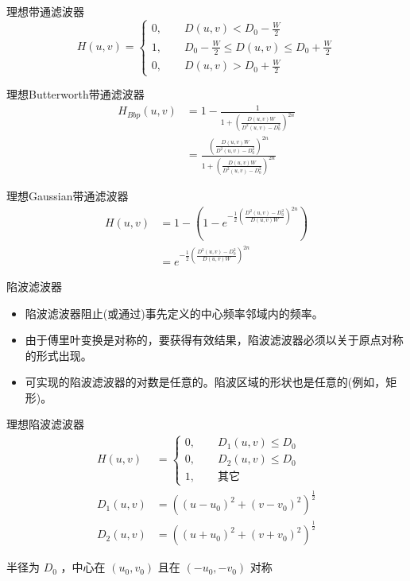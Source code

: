 \documentclass[presentation]{beamer}
\begin{document}
\begin{frame}[label={sec:org604fcd4}]{理想带通滤波器}
\[ H(u,v)=
\begin{cases}
0, \qquad D(u,v)<D_0-\frac{W}{2} \\
1, \qquad D_0-\frac{W}{2} \leq D(u,v) \leq D_0+\frac{W}{2}\\
0, \qquad D(u,v)>D_0+\frac{W}{2}
\end{cases} \]
\end{frame}

\begin{frame}[label={sec:org8490ae4}]{理想Butterworth带通滤波器}
\begin{align*}
H_{Bbp}(u,v) &=1- \frac{1}{1+\left(\frac{D(u,v)W}{D^2(u,v)-D_0^2}\right)^{2n}}\\
&= \frac{\left(\frac{D(u,v)W}{D^2(u,v)-D_0^2}\right)^{2n}}{1+\left(\frac{D(u,v)W}{D^2(u,v)-D_0^2}\right)^{2n}}
\end{align*}
\end{frame}

\begin{frame}[label={sec:orgc352d27}]{理想Gaussian带通滤波器}
\begin{align*}
H(u,v)&=1-\left(1-e^{-\frac{1}{2}\left(\frac{D^2(u,v)-D_0^2}{D(u,v)W}\right)^{2n}}\right)\\
&=e^{-\frac{1}{2}\left(\frac{D^2(u,v)-D_0^2}{D(u,v)W}\right)^{2n}}
\end{align*}
\end{frame}

\begin{frame}[label={sec:orgdc38ea0}]{陷波滤波器}
\begin{itemize}
\item 陷波滤波器阻止(或通过)事先定义的中心频率邻域内的频率。
\item 由于傅里叶变换是对称的，要获得有效结果，陷波滤波器必须以关于原点对称的形式出现。
\item 可实现的陷波滤波器的对数是任意的。陷波区域的形状也是任意的(例如，矩形)。
\end{itemize}
\end{frame}

\begin{frame}[label={sec:org9a41238}]{理想陷波滤波器}
\begin{align*}
H(u,v) &= \begin{cases}
0,\qquad D_1(u,v)\leq D_0  \\
0, \qquad D_2(u,v)\leq D_0 \\
1, \qquad \text{其它}
\end{cases}\\
D_1(u,v) &=\left((u-u_0)^2+(v-v_0)^2\right)^{\frac{1}{2}}\\
D_2(u,v) &=\left((u+u_0)^2+(v+v_0)^2\right)^{\frac{1}{2}}
\end{align*}

半径为 \(D_0\) ，中心在 \((u_0,v_0)\) 且在 \((-u_0,-v_0)\) 对称
\end{frame}
\end{document}
